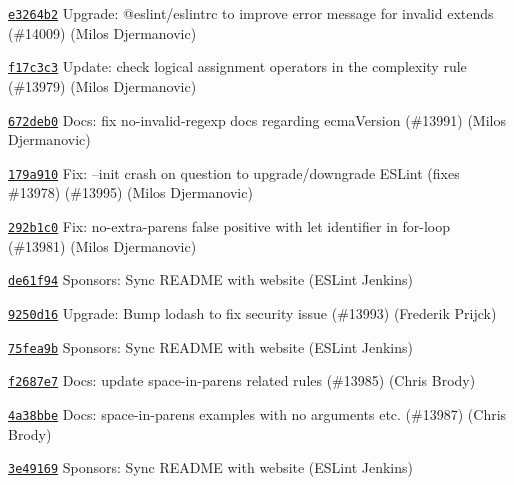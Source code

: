 \begin{DoxyItemize}
\item \href{https://github.com/eslint/eslint/commit/e3264b26a625d926a1ea96df1c4b643af5c3797c}{\texttt{ {\ttfamily e3264b2}}} Upgrade\+: @eslint/eslintrc to improve error message for invalid extends (\#14009) (Milos Djermanovic)
\item \href{https://github.com/eslint/eslint/commit/f17c3c371789ffa84f0cda57101e8193899adbe6}{\texttt{ {\ttfamily f17c3c3}}} Update\+: check logical assignment operators in the complexity rule (\#13979) (Milos Djermanovic)
\item \href{https://github.com/eslint/eslint/commit/672deb057a14a7acad8c669189870009f1edb8a6}{\texttt{ {\ttfamily 672deb0}}} Docs\+: fix no-\/invalid-\/regexp docs regarding ecma\+Version (\#13991) (Milos Djermanovic)
\item \href{https://github.com/eslint/eslint/commit/179a910b32e853bc12a9dd71f7c10e762cbeac44}{\texttt{ {\ttfamily 179a910}}} Fix\+: --init crash on question to upgrade/downgrade ESLint (fixes \#13978) (\#13995) (Milos Djermanovic)
\item \href{https://github.com/eslint/eslint/commit/292b1c0017bc442d399f67e01d699c59e6b71453}{\texttt{ {\ttfamily 292b1c0}}} Fix\+: no-\/extra-\/parens false positive with {\ttfamily let} identifier in for-\/loop (\#13981) (Milos Djermanovic)
\item \href{https://github.com/eslint/eslint/commit/de61f9444cf58a4d70e126ab3d10bf20851de7c9}{\texttt{ {\ttfamily de61f94}}} Sponsors\+: Sync README with website (ESLint Jenkins)
\item \href{https://github.com/eslint/eslint/commit/9250d167ceb5684669eabe93dae326e33f0684f2}{\texttt{ {\ttfamily 9250d16}}} Upgrade\+: Bump lodash to fix security issue (\#13993) (Frederik Prijck)
\item \href{https://github.com/eslint/eslint/commit/75fea9bcdd3dde5a07e0089d9011a4df518cdbe3}{\texttt{ {\ttfamily 75fea9b}}} Sponsors\+: Sync README with website (ESLint Jenkins)
\item \href{https://github.com/eslint/eslint/commit/f2687e71f9e2a2773f821c4dc1a02abe95b97df4}{\texttt{ {\ttfamily f2687e7}}} Docs\+: update space-\/in-\/parens related rules (\#13985) (Chris Brody)
\item \href{https://github.com/eslint/eslint/commit/4a38bbe81b4b29ca1a4e62d0a0cc8d525455b063}{\texttt{ {\ttfamily 4a38bbe}}} Docs\+: space-\/in-\/parens examples with no arguments etc. (\#13987) (Chris Brody)
\item \href{https://github.com/eslint/eslint/commit/3e491698687aa08b3b798cee0931f0872ca1bc55}{\texttt{ {\ttfamily 3e49169}}} Sponsors\+: Sync README with website (ESLint Jenkins)

\end{DoxyItemize}
